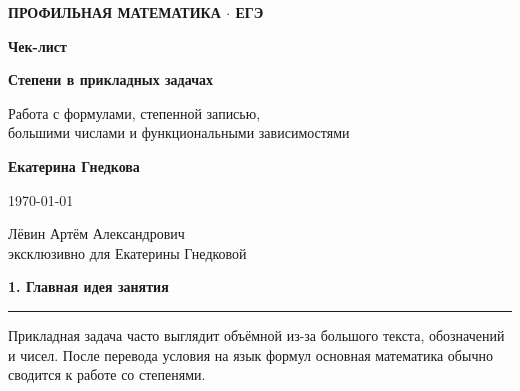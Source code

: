 \documentclass[a4paper,12pt]{article}
\newcommand{\topic}[1]{%
  \vspace{0.5em}
  {\Large\bfseries\color{darkaccent}#1}\par
  \vspace{0.25em}
  {\color{accent}\rule{\linewidth}{0.7pt}}\par
  \vspace{0.6em}
}
\begin{document}
\begin{titlepage}
\thispagestyle{empty}

\begin{center}

\vspace*{22mm}

{\small\color{accent}\bfseries
ПРОФИЛЬНАЯ МАТЕМАТИКА \(\cdot\) ЕГЭ
}

\vspace{18mm}

{\Huge\bfseries\color{darkaccent}
Чек-лист
}

\vspace{7mm}

{\LARGE\bfseries
Степени в прикладных задачах
}

\vspace{8mm}

{\large
Работа с формулами, степенной записью,\\
большими числами и функциональными зависимостями
}

\vfill

{\large\bfseries
Екатерина Гнедкова
}

\vspace{6mm}

{\normalsize
\today
}

\vspace{13mm}

{\small
Лёвин Артём Александрович\\
эксклюзивно для Екатерины Гнедковой
}

\end{center}


\end{titlepage}

\topic{1. Главная идея занятия}

Прикладная задача часто выглядит объёмной из-за большого текста,
обозначений и чисел. После перевода условия на язык формул основная
математика обычно сводится к работе со степенями.
\end{document}
